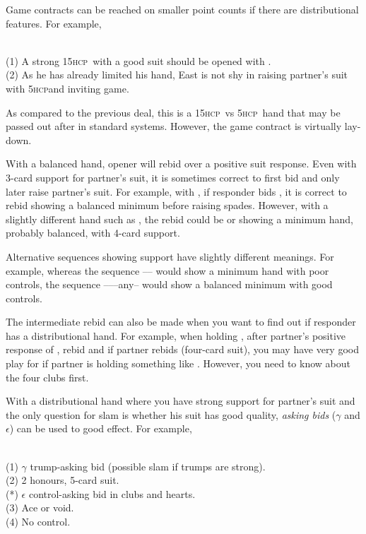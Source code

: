 \documentclass[a4paper,article,oneside]{memoir}
\newcommand{\gap}{\vspace{\baselineskip}}
\newcommand{\hcp}{\textsc{hcp}}
\begin{document}
\gap

Game contracts can be reached on smaller point counts if there are
distributional features. For example,

 \\ (1) A strong 15\hcp\ with a good
suit should be opened with .\\ (2) As he has already limited his
hand, East is not shy in raising partner's suit with 5\hcp and
inviting game.

As compared to the previous deal, this is a 15\hcp\ vs 5\hcp\ hand
that may be passed out after  in standard systems. However, the
game contract is virtually lay-down.

\gap

With a balanced hand, opener will rebid \nt{} over a positive suit
response.  Even with 3-card support for partner's suit, it is
sometimes correct to first bid \nt{} and only later raise partner's
suit. For example, with , if responder bids
, it is correct to rebid  showing a balanced minimum
before raising spades. However, with a slightly different hand such as
, the rebid could be  or  showing
a minimum hand, probably balanced, with 4-card support.

Alternative sequences showing support have slightly different
meanings.  For example, whereas the sequence ----
would show a minimum hand with poor controls, the sequence
------any-- would show a balanced minimum with
good controls.

The intermediate  rebid can also be made when you want to find
out if responder has a distributional hand. For example, when holding
, after partner's positive response of ,
rebid  and if partner rebids  (four-card suit), you may
have very good play for  if partner is holding something like
.  However, you need to know about the four
clubs first.

\gap

With a distributional hand where you have strong support for partner's
suit and the only question for slam is whether his suit has good
quality, \emph{asking bids} ($\gamma$ and $\epsilon$) can be used to
good effect. For example,

 \\
(1) $\gamma$ trump-asking bid (possible slam if trumps are strong). \\
(2) 2 honours, 5-card suit. \\ (*) $\epsilon$ control-asking bid in
clubs and hearts. \\ (3) Ace or void. \\ (4) No control.
\end{document}
